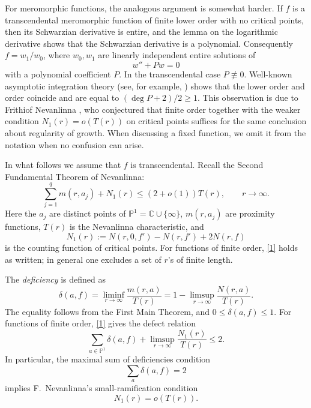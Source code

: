\documentclass[11pt,letterpaper,reqno]{amsart}
\theoremstyle{remark}
\numberwithin{equation}{section}
\newcommand{\C}{\mathbb C}
\newcommand{\PP}{\mathbb P}
\begin{document}
For meromorphic functions, the
analogous argument is somewhat harder. If $f$ is a transcendental
meromorphic function of finite lower order with no critical points, then
its Schwarzian derivative is entire, and the lemma on the
logarithmic derivative
shows that the Schwarzian derivative is a polynomial. Consequently $f=w_1/w_0$, where
$w_0,w_1$ are linearly independent entire solutions of
\[
 w''+Pw=0
\]
with a polynomial coefficient $P$. In the transcendental case $P\not\equiv0$.
Well-known asymptotic integration theory (see, for example,
\cite{Was65}) shows that the lower order and order coincide and are equal to
$(\deg P+2)/2\geq1$.
This observation is due to Frithiof Nevanlinna \cite{Nev30}, who conjectured
that finite order together with the weaker condition
$N_1(r)=o(T(r))$ on critical points suffices for the same conclusion about
regularity of growth. When discussing a fixed function, we omit it from
the notation when no confusion can arise.

In what follows we assume that $f$ is transcendental.
Recall the Second Fundamental Theorem of Nevanlinna:
\begin{equation}\label{1}
 \sum_{j=1}^q m(r,a_j)+N_1(r)\leq(2+o(1))T(r),\qquad r\to\infty.
\end{equation}
Here the $a_j$ are distinct points of $\PP^1=\C\cup\{\infty\}$,
$m(r,a_j)$ are proximity functions, $T(r)$ is the Nevanlinna
characteristic, and
\[
 N_1(r):=N(r,0,f')-N(r,f')+2N(r,f)
\]
is the counting function of critical points. For functions of finite order,
\eqref{1} holds as written; in general one excludes a set of $r$'s of
finite length.

The \emph{deficiency} is defined as
\[
 \delta(a,f)=\liminf_{r\to\infty}\frac{m(r,a)}{T(r)}
 =1-\limsup_{r\to\infty}\frac{N(r,a)}{T(r)}.
\]
The equality follows from the First Main Theorem, and
$0\leq\delta(a,f)\leq1$. For functions of finite order, \eqref{1} gives
the defect relation
\begin{equation}\label{2}
 \sum_{a\in\PP^1}\delta(a,f)
 +\limsup_{r\to\infty}\frac{N_1(r)}{T(r)}\leq2.
\end{equation}
In particular, the maximal sum of deficiencies condition
\begin{equation}\label{sum}
 \sum_a\delta(a,f)=2
\end{equation}
implies F.~Nevanlinna's small-ramification condition
\begin{equation}\label{smal}
 N_1(r)=o(T(r)).
\end{equation}
\end{document}
